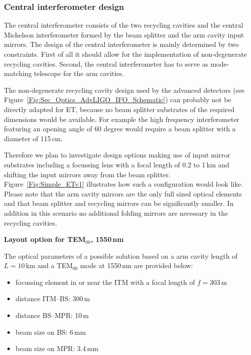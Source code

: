\FloatBarrier
\subsubsection{Central interferometer design}
\label{sec:opt_layout_CITF}

The central interferometer consists of the two recycling cavities and the
central Michelson interferometer formed by the beam splitter and the arm cavity
input mirrors.
The design of the central interferometer is mainly determined by two
constraints. First of all it should allow for the implementation of
non-degenerate recycling cavities. Second, the central interferometer has to
serve as mode-matching telescope for the arm cavities.

The non-degenerate recycling cavity design used by the advanced detectors
(see Figure~\ref{Fig:Sec_Optics_AdvLIGO_IFO_Schematic}) can probably not be
directly adapted for ET, because no beam splitter substrates of the required dimensions
would be available. For example the high frequency interferometer featuring an opening
angle of  60 degree would require a beam splitter with a diameter of 115\,cm.

Therefore we plan to investigate design options making use of input
mirror substrates including a focussing lens with a focal length of 0.2 to 1\,km
and shifting the input mirrors away from the beam splitter.  Figure~\ref{Fig:Simple_ETv1}
illustrates how such a configuration would look like. Please note that the arm cavity mirrors are the only full sized optical
elements and that beam splitter and recycling mirrors can be significantly smaller. In addition in this scenario no
additional folding mirrors are necessary in the recycling cavities.

\textbf{Layout option for TEM$_{00}$, 1550\,nm}
\nopagebreak

The optical parameters
of a possible solution based on a arm cavity length of
$L=10$\,km and a TEM$_{00}$ mode at 1550\,nm are provided below:
\begin{itemize}
\item focussing element in or near the ITM with a focal length of $f=303$\,m
\item distance ITM--BS: 300\,m
\item distance BS--MPR: 10\,m
\item beam size on BS: 6\,mm
\item beam size on MPR: 3.4\,mm
\end{itemize}

